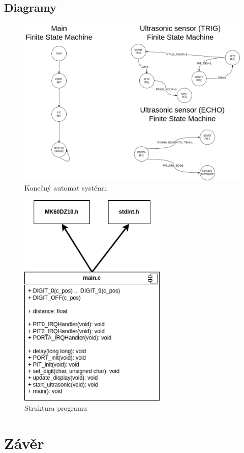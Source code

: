 \documentclass[a4paper,11pt]{article}
\begin{document}
    \subsection{Diagramy}
    \begin{figure}[ht!]
        \centering
        \includegraphics[width=450pt]{FSM}
        \caption{Konečný automat systému}
    \end{figure}
    \begin{figure}[ht!]
        \centering
        \includegraphics[width=200pt]{program}
        \caption{Struktura programu}
    \end{figure}
    \clearpage

    \section{Závěr}
\end{document}
